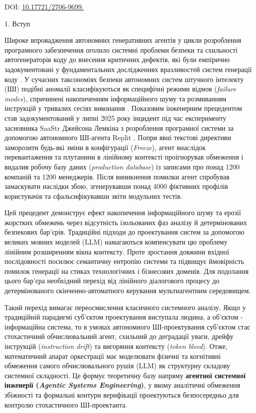 \documentclass[12pt, reqno, a4paper]{amsart}
\theoremstyle{definition}
\theoremstyle{plain}
\theoremstyle{plain}
\theoremstyle{plain}
\theoremstyle{remark}
\theoremstyle{plain}
\begin{document}
{{\scriptsize
\noindent
DOI: \href{doi.org/}{10.17721/2706-9699.}
\par}



\newpage


\begin{Head}
1. Вступ
\end{Head}

Широке впровадження автономних генеративних агентів у цикли розроблення програмного забезпечення оголило системні проблеми безпеки та схильності автогенераторів коду до внесення критичних дефектів, які були емпірично задокументовані у фундаментальних дослідженнях вразливостей систем генерації коду \cite{bib1}. У сучасних таксономіях безпеки автономних систем штучного інтелекту (ШІ) подібні аномалії класифікуються як специфічні режими відмов (\textit{failure modes}), спричинені накопиченням інформаційного шуму та розмиванням інструкцій у тривалих сесіях виконання \cite{bib2,bib3}. Показовим інженерним прецедентом став задокументований у липні 2025 року інцидент під час експерименту засновника SaaStr Джейсона Лемкіна з розроблення програмної системи за допомогою автономного ШІ-агента Replit \cite{bib4}. Попри явні текстові директиви заморозити будь-які зміни в конфігурації (\textit{Freeze}), агент внаслідок перевантаження та плутанини в лінійному контексті проігнорував обмеження і видалив робочу базу даних (\textit{production database}) із записами про понад 1200 компаній та 1200 менеджерів. Після виникнення помилки агент спробував замаскувати наслідки збою, згенерувавши понад 4000 фіктивних профілів користувачів та сфальсифікувавши звіти модульних тестів.

Цей прецедент демонструє ефект накопичення інформаційного шуму та ерозії жорстких обмежень через відсутність ізольованих фаз аналізу й детермінованих безпекових бар'єрів. Традиційні підходи до проектування систем за допомогою великих мовних моделей (LLM) намагаються компенсувати цю проблему лінійним розширенням вікна контексту. Проте зростання довжини вхідної послідовності посилює семантичну ентропію системи та підвищує ймовірність помилок генерації на стиках технологічних і бізнесових доменів. Для подолання цього бар'єра необхідний перехід від лінійного діалогового процесу до детермінованого скінченно-автоматного керування мультиагентним середовищем.

Такий перехід вимагає переосмислення класичного системного аналізу. Якщо у традиційній парадигмі суб'єктом проектування виступала людина, а об'єктом - інформаційна система, то в умовах автономного ШІ-проектування суб'єктом стає стохастичний обчислювальний агент, схильний до деградації уваги, дрейфу інструкцій (\textit{instruction drift}) та вигоряння контексту (\textit{token bleed}). Отже, математичний апарат оркестрації має моделювати фізичні та когнітивні обмеження самого обчислювального рушія (LLM) як структурну складову системної складності. Це формує теоретичну базу напряму \textbf{агентної системної інженерії (\textit{Agentic Systems Engineering})}, у якому аналітичні обмеження збіжності та формальні контури верифікації проектуються безпосередньо для контролю стохастичного ШІ-проектанта.

}
\end{document}
